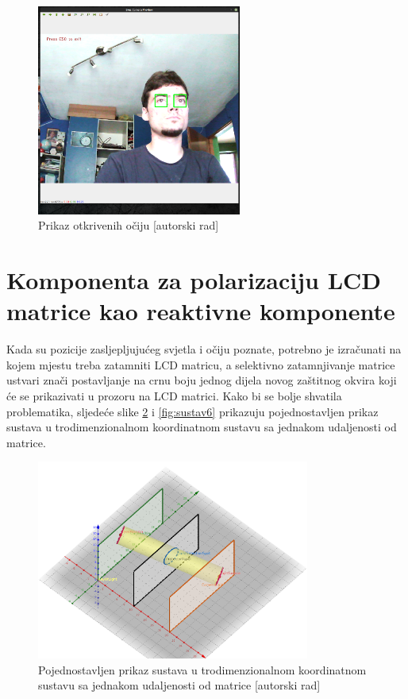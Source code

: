 \documentclass{foi}
\begin{document}
\begin{figure}[h!]
    \centering
    \includegraphics[width=0.6\textwidth]{slike/sustav3}
    \caption{Prikaz otkrivenih očiju [autorski rad]}
    \label{fig:sustav3}
\end{figure}

\pagebreak
\section{Komponenta za polarizaciju LCD matrice kao reaktivne komponente}

Kada su pozicije zasljepljujućeg svjetla i očiju poznate, potrebno je izračunati na kojem mjestu treba zatamniti LCD matricu, a selektivno zatamnjivanje matrice ustvari znači postavljanje na crnu boju jednog dijela novog zaštitnog okvira koji će se prikazivati u prozoru na LCD matrici. Kako bi se bolje shvatila problematika, sljedeće slike \ref{fig:sustav5} i \ref{fig:sustav6} prikazuju pojednostavljen prikaz sustava u trodimenzionalnom koordinatnom sustavu sa jednakom udaljenosti od matrice.

\begin{figure}[h!]
    \centering
    \includegraphics[width=0.8\textwidth]{slike/sustav5}
    \caption{Pojednostavljen prikaz sustava u trodimenzionalnom koordinatnom sustavu sa jednakom udaljenosti od matrice [autorski rad]}
    \label{fig:sustav5}
\end{figure}
\end{document}
